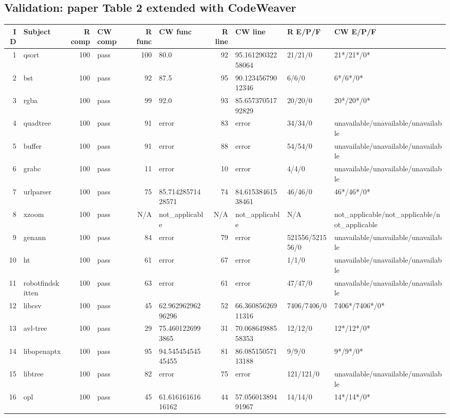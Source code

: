 \documentclass{article}
\begin{document}
\subsection*{Validation: paper Table 2 extended with CodeWeaver}
\scriptsize
\begin{longtable}{r l r l r l r l l l}
ID & Subject & R comp & CW comp & R func & CW func & R line & CW line & R E/P/F & CW E/P/F\\\hline
1 & qsort & 100 & pass & 100 & 80.0 & 92 & 95.16129032258064 & 21/21/0 & 21*/21*/0*\\
2 & bst & 100 & pass & 92 & 87.5 & 95 & 90.12345679012346 & 6/6/0 & 6*/6*/0*\\
3 & rgba & 100 & pass & 99 & 92.0 & 93 & 85.65737051792829 & 20/20/0 & 20*/20*/0*\\
4 & quadtree & 100 & pass & 91 & error & 83 & error & 34/34/0 & unavailable/unavailable/unavailable\\
5 & buffer & 100 & pass & 91 & error & 88 & error & 54/54/0 & unavailable/unavailable/unavailable\\
6 & grabc & 100 & pass & 11 & error & 10 & error & 4/4/0 & unavailable/unavailable/unavailable\\
7 & urlparser & 100 & pass & 75 & 85.71428571428571 & 74 & 84.61538461538461 & 46/46/0 & 46*/46*/0*\\
8 & xzoom & 100 & pass & N/A & not\_applicable & N/A & not\_applicable & N/A & not\_applicable/not\_applicable/not\_applicable\\
9 & genann & 100 & pass & 84 & error & 79 & error & 521556/521556/0 & unavailable/unavailable/unavailable\\
10 & ht & 100 & pass & 61 & error & 67 & error & 1/1/0 & unavailable/unavailable/unavailable\\
11 & robotfindskitten & 100 & pass & 63 & error & 61 & error & 47/47/0 & unavailable/unavailable/unavailable\\
12 & libcsv & 100 & pass & 45 & 62.96296296296296 & 52 & 66.36085626911316 & 7406/7406/0 & 7406*/7406*/0*\\
13 & avl-tree & 100 & pass & 29 & 75.4601226993865 & 31 & 70.06864988558353 & 12/12/0 & 12*/12*/0*\\
14 & libopenaptx & 100 & pass & 95 & 94.54545454545455 & 81 & 86.08515057113188 & 9/9/0 & 9*/9*/0*\\
15 & libtree & 100 & pass & 82 & error & 75 & error & 121/121/0 & unavailable/unavailable/unavailable\\
16 & opl & 100 & pass & 45 & 61.61616161616162 & 44 & 57.05601389491967 & 14/14/0 & 14*/14*/0*\\

\end{longtable}
\end{document}
